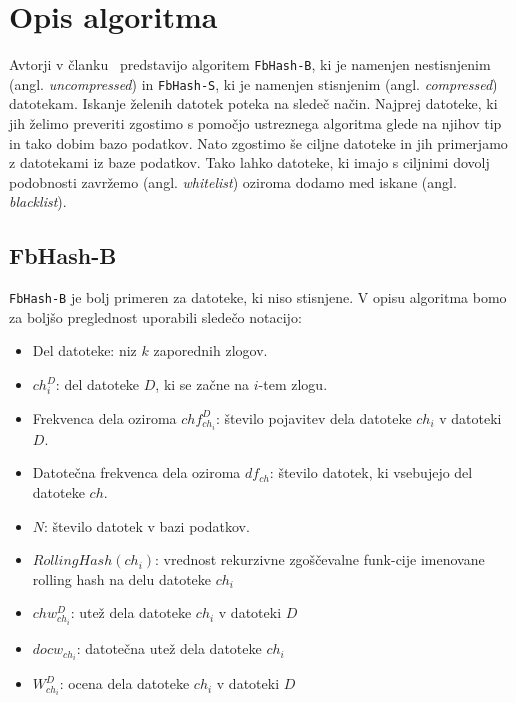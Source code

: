 \documentclass{acm_proc_article-sp}
\begin{document}
\section{Opis algoritma}

Avtorji v članku~\cite{fbhash} predstavijo algoritem \texttt{FbHash-B}, ki je namenjen nestisnjenim (angl. \emph{uncompressed}) in \texttt{FbHash-S}, ki je namenjen stisnjenim (angl. \emph{compressed}) datotekam. Iskanje želenih datotek poteka na sledeč način. Najprej datoteke, ki jih želimo preveriti zgostimo s pomočjo ustreznega algoritma glede na njihov tip in tako dobim bazo podatkov. Nato zgostimo še ciljne datoteke in jih primerjamo z datotekami iz baze podatkov. Tako lahko datoteke, ki imajo s ciljnimi dovolj podobnosti zavržemo (angl. \emph{whitelist}) oziroma dodamo med iskane (angl. \emph{blacklist}).

\subsection{FbHash-B}

\texttt{FbHash-B} je bolj primeren za datoteke, ki niso stisnjene. V opisu algoritma bomo za boljšo preglednost uporabili sledečo notacijo:
\begin{itemize}
  \item Del datoteke: niz $k$ zaporednih zlogov. 
  \item $ch_{i}^D$: del datoteke $D$, ki se začne na $i$-tem zlogu.
  \item Frekvenca dela oziroma $chf_{ch_i}^D$: število pojavitev dela datoteke $ch_i$ v datoteki $D$.
  \item Datotečna frekvenca dela oziroma $df_{ch}$: število datotek, ki vsebujejo del datoteke $ch$.
  \item $N$: število datotek v bazi podatkov.
  \item $RollingHash(ch_i)$: vrednost rekurzivne zgoščevalne funk-cije imenovane rolling hash na delu datoteke $ch_i$
  \item $chw_{ch_i}^D$: utež dela datoteke $ch_i$ v datoteki $D$
  \item $docw_{ch_i}$: datotečna utež dela datoteke $ch_i$
  \item $W_{ch_i}^D$: ocena dela datoteke $ch_i$ v datoteki $D$
\end{itemize}
\end{document}

